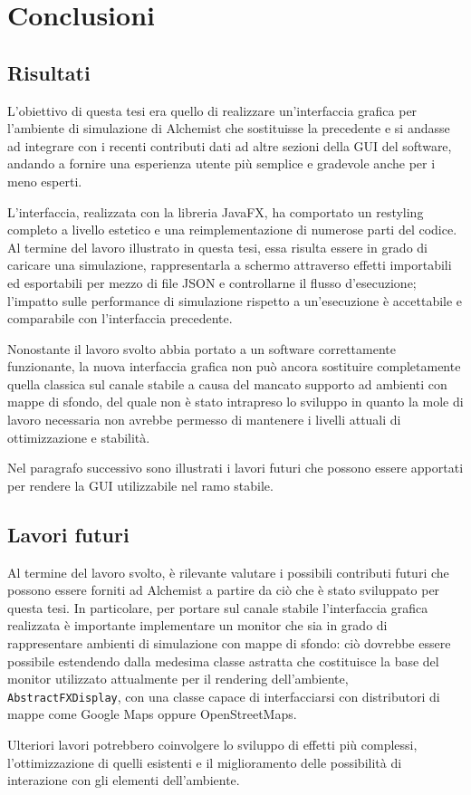 
\chapter{Conclusioni}\label{ch:conclusioni}
    \section{Risultati}\label{sec:risultati}
        L'obiettivo di questa tesi era quello di realizzare un'interfaccia grafica per l'ambiente di simulazione di Alchemist che sostituisse la precedente e si andasse ad integrare con i recenti contributi dati ad altre sezioni della GUI del software, andando a fornire una esperienza utente più semplice e gradevole anche per i meno esperti.

        L'interfaccia, realizzata con la libreria JavaFX, ha comportato un restyling completo a livello estetico e una reimplementazione di numerose parti del codice.
        Al termine del lavoro illustrato in questa tesi, essa risulta essere in grado di caricare una simulazione, rappresentarla a schermo attraverso effetti importabili ed esportabili per mezzo di file JSON e controllarne il flusso d'esecuzione;
        l'impatto sulle performance di simulazione rispetto a un'esecuzione  è accettabile e comparabile con l'interfaccia precedente.

        Nonostante il lavoro svolto abbia portato a un software correttamente funzionante, la nuova interfaccia grafica non può ancora sostituire completamente quella classica sul canale stabile a causa del mancato supporto ad ambienti con mappe di sfondo, del quale non è stato intrapreso lo sviluppo in quanto la mole di lavoro necessaria non avrebbe permesso di mantenere i livelli attuali di ottimizzazione e stabilità.

        Nel paragrafo successivo sono illustrati i lavori futuri che possono essere apportati per rendere la GUI utilizzabile nel ramo stabile.

    \section{Lavori futuri}\label{sec:futuro}
        Al termine del lavoro svolto, è rilevante valutare i possibili contributi futuri che possono essere forniti ad Alchemist a partire da ciò che è stato sviluppato per questa tesi.
        In particolare, per portare sul canale stabile l'interfaccia grafica realizzata è importante implementare un monitor che sia in grado di rappresentare ambienti di simulazione con mappe di sfondo: ciò dovrebbe essere possibile estendendo dalla medesima classe astratta che costituisce la base del monitor utilizzato attualmente per il rendering dell'ambiente, \texttt{AbstractFXDisplay}, con una classe capace di interfacciarsi con distributori di mappe come Google Maps oppure OpenStreetMaps.

        Ulteriori lavori potrebbero coinvolgere lo sviluppo di effetti più complessi, l'ottimizzazione di quelli esistenti e il miglioramento delle possibilità di interazione con gli elementi dell'ambiente.
